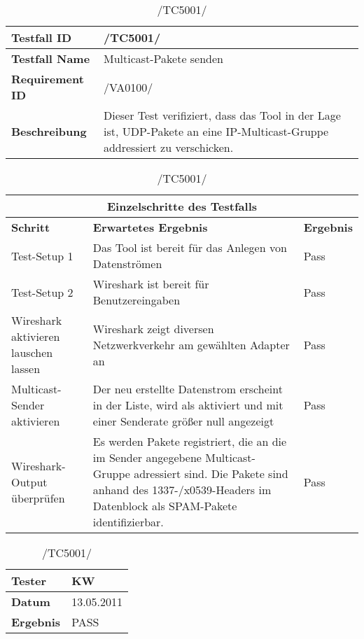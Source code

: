     \begin{table}[h]
        \caption{/TC5001/}
        \label{tab:TC5001}
        \begin{center}
           \begin{tabular}{|p{3.5cm}|p{11cm}|}
                \hline
                    \textbf{Testfall ID} & /TC5001/\\
                \hline
                    \textbf{Testfall Name} & Multicast-Pakete senden\\
                \hline
                    \textbf{Requirement ID} & /VA0100/\\
                \hline
                    \textbf{Beschreibung} & Dieser Test verifiziert, dass das
                    Tool in der Lage ist, UDP-Pakete an eine
                    IP-Multicast-Gruppe addressiert zu verschicken.\\
                \hline
            \end{tabular}
\begin{tabular}{|p{4cm}|p{7.8cm}|p{2.3cm}|}
\multicolumn{3}{|c|}{\textbf{Einzelschritte des Testfalls}} \\
                \hline
                    \textbf{Schritt} & \textbf{Erwartetes Ergebnis} & \textbf{Ergebnis}\\
                \hline
                    Test-Setup 1 & 
                    Das Tool ist bereit für das Anlegen von Datenströmen & Pass\\
                \hline
                    Test-Setup 2 &
                    Wireshark ist bereit für Benutzereingaben & Pass\\
                \hline
                    Wireshark aktivieren
                    lauschen lassen & 
                    Wireshark zeigt diversen Netzwerkverkehr am gewählten
                    Adapter an& Pass\\
                \hline
                    Multicast-Sender aktivieren &
                    Der neu erstellte Datenstrom erscheint in der Liste, wird
                    als aktiviert und mit einer Senderate größer null
                    angezeigt& Pass\\
                \hline
                    Wireshark-Output überprüfen &
                    Es werden Pakete registriert, die an die im Sender
                    angegebene Multicast-Gruppe adressiert sind. Die Pakete
                    sind anhand des 1337-/x0539-Headers im Datenblock als
                    SPAM-Pakete identifizierbar.& Pass\\
                \hline
            \end{tabular}     
                   \begin{tabular}{|p{3.5cm}|p{11cm}|}
                \textbf{Tester} & KW\\
                \hline
                \textbf{Datum} & 13.05.2011\\
                \hline
                \textbf{Ergebnis} & PASS\\
                \hline
            \end{tabular}
        \end{center}
    \end{table}


